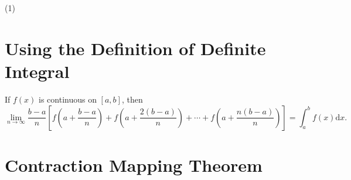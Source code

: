 \begin{solution}
  (1)
\end{solution}

\section{Using the Definition of Definite Integral}

\begin{proposition}{}{}
  If $f(x)$ is continuous on $[a,b]$, then
  \begin{equation}
    \lim \limits _{n \rightarrow \infty} \frac{b - a}{n} \left[
      f(a + \frac{b - a}{n}) + f( a + \frac{2(b-a)}{n}) + \cdots + f(a + \frac{n(b-a)}{n})
    \right] = \int_a^b f(x) \mathrm{d} x.
  \end{equation}
\end{proposition}

\section{Contraction Mapping Theorem}


